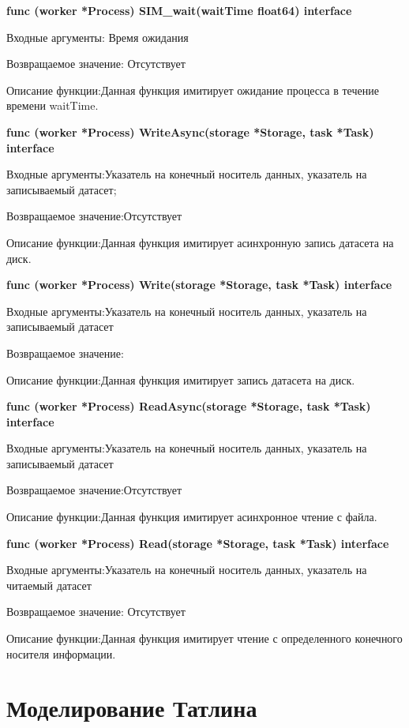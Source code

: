 \textbf{func (worker *Process) SIM\_wait(waitTime float64) interface}

Входные аргументы: Время ожидания

Возвращаемое значение: Отсутствует

Описание функции:Данная функция имитирует ожидание процесса в течение времени waitTime. 

\textbf{func (worker *Process) WriteAsync(storage *Storage, task *Task) interface}

Входные аргументы:Указатель на конечный носитель данных, указатель на записываемый датасет;

Возвращаемое значение:Отсутствует

Описание функции:Данная функция имитирует асинхронную запись датасета на диск.

\textbf{func (worker *Process) Write(storage *Storage, task *Task) interface}

Входные аргументы:Указатель на конечный носитель данных, указатель на записываемый датасет

Возвращаемое значение:

Описание функции:Данная функция имитирует запись датасета на диск.

\textbf{func (worker *Process) ReadAsync(storage *Storage, task *Task) interface}

Входные аргументы:Указатель на конечный носитель данных, указатель на записываемый датасет

Возвращаемое значение:Отсутствует

Описание функции:Данная функция имитирует асинхронное чтение с файла. 

\textbf{func (worker *Process) Read(storage *Storage, task *Task) interface}

Входные аргументы:Указатель на конечный носитель данных, указатель на читаемый датасет

Возвращаемое значение: Отсутствует

Описание функции:Данная функция имитирует чтение с определенного конечного носителя информации.

\section{Моделирование Татлина}\label{Tatlin}

